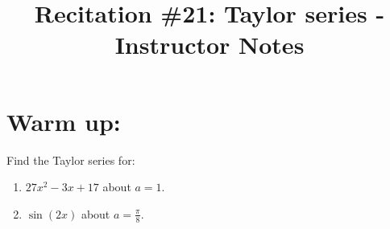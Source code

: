\documentclass[handout,instructornotes]{ximera}
\title{Recitation \#21: Taylor series - Instructor Notes}
\begin{document}
\begin{abstract}		\end{abstract}
\maketitle



\section{Warm up:}
Find the Taylor series for:  
	\begin{enumerate}
	\item  $27x^2 - 3x + 17$ about $a=1$.  
	\item  $\sin(2x)$ about $a = \frac{\pi}{8}$.  
	\end{enumerate}
	
\end{document}
